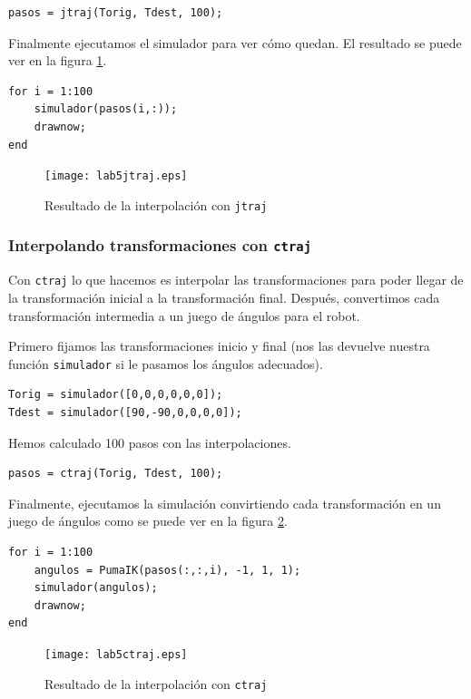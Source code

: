 \documentclass{article}
\newcommand{\fref}[1]{figura \ref{fig:#1}}
\begin{document}
\begin{lstlisting}[frame=single]
pasos = jtraj(Torig, Tdest, 100);
\end{lstlisting}

Finalmente ejecutamos el simulador para ver cómo quedan. El resultado se puede ver en la \fref{lab5jtraj}.
\begin{lstlisting}[frame=single]
for i = 1:100
    simulador(pasos(i,:));
    drawnow;
end
\end{lstlisting}

\begin{figure}[h]
\centering
\texttt{[image: lab5jtraj.eps]}
\caption{Resultado de la interpolación con {\tt jtraj}}
\label{fig:lab5jtraj}
\end{figure}

\subsubsection{Interpolando transformaciones con {\tt ctraj}}
Con {\tt ctraj} lo que hacemos es interpolar las transformaciones para poder llegar de la transformación inicial a la transformación final. Después, convertimos cada transformación intermedia a un juego de ángulos para el robot.

Primero fijamos las transformaciones inicio y final (nos las devuelve nuestra función {\tt simulador} si le pasamos los ángulos adecuados).

\begin{lstlisting}[frame=single]
Torig = simulador([0,0,0,0,0,0]);
Tdest = simulador([90,-90,0,0,0,0]);
\end{lstlisting}

Hemos calculado 100 pasos con las interpolaciones.
\begin{lstlisting}[frame=single]
pasos = ctraj(Torig, Tdest, 100);
\end{lstlisting}

Finalmente, ejecutamos la simulación convirtiendo cada transformación en un juego de ángulos como se puede ver en 
la \fref{lab5ctraj}.

\begin{lstlisting}[frame=single]
for i = 1:100
    angulos = PumaIK(pasos(:,:,i), -1, 1, 1);
    simulador(angulos);
    drawnow;
end
\end{lstlisting}

\begin{figure}[h]
\centering
\texttt{[image: lab5ctraj.eps]}
\caption{Resultado de la interpolación con {\tt ctraj}}
\label{fig:lab5ctraj}
\end{figure}
\end{document}
